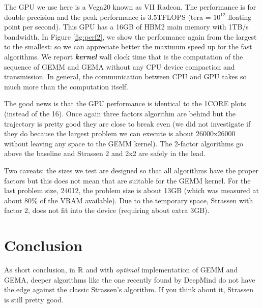 \documentclass[acmsmall]{acmart}
\begin{document}


The GPU we use here is a Vega20 known as VII Radeon. The performance
is for double precision and the peak performance is 3.5TFLOPS (tera =
$10^{12}$ floating point per second). This GPU has a 16GB of HBM2 main
memory with 1TB/s bandwidth.  In Figure \ref{fig:perf2}, we show the
performance again from the largest to the smallest: so we can
appreciate better the maximum speed up for the fast algorithms. We
report {\em \bf kernel} wall clock time that is the computation of the
sequence of GEMM and GEMA without any CPU device compaction and
transmission. In general, the communication between CPU and GPU takes
so much more than the computation itself.


The good news is that the GPU performance is identical to the 1CORE
plots (instead of the 16). Once again three factors algorithm are
behind but the trajectory is pretty good they are close to break even
(we did not investigate if they do because the largest problem we can
execute is about 26000x26000 without leaving any space to the GEMM
kernel). The 2-factor algorithms go above the baseline and Strassen 2
and 2x2 are safely in the lead.


Two caveats: the sizes we test are designed so that all algorithms
have the proper factors but this does not mean that are suitable for
the GEMM kernel. For the last problem size, 24012, the problem size is
about 13GB (which was measured at about 80\% of the VRAM
available). Due to the temporary space, Strassen with factor 2, does
not fit into the device (requiring about extra 3GB).

\section{Conclusion}
As short conclusion, in $\mathbb{R}$ and with {\em optimal} implementation of
GEMM and GEMA, deeper algorithms like the one recently found by
DeepMind do not have the edge against the classic Strassen's
algorithm. If you think about it, Strassen is still pretty good.


  







%

 

%
\end{document}

